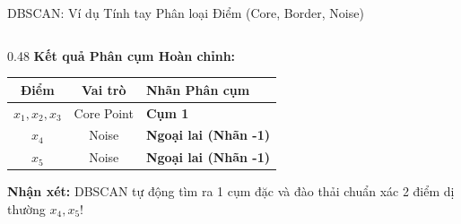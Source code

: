 \documentclass[aspectratio=169,10pt]{beamer}
\begin{document}
\begin{frame}{DBSCAN: Ví dụ Tính tay Phân loại Điểm (Core, Border, Noise)}
\begin{columns}[T]
\begin{column}{0.48\textwidth}
      \textbf{Kết quả Phân cụm Hoàn chỉnh:}
      \begin{table}[]
        \centering
        \begin{tabular}{c c l}
          \toprule
          \textbf{Điểm} & \textbf{Vai trò} & \textbf{Nhãn Phân cụm} \\
          \midrule
          $x_1, x_2, x_3$ & Core Point & \textbf{Cụm 1} \\
          $x_4$ & Noise & \textbf{Ngoại lai (Nhãn -1)} \\
          $x_5$ & Noise & \textbf{Ngoại lai (Nhãn -1)} \\
          \bottomrule
        \end{tabular}
      \end{table}
      \textbf{Nhận xét:} DBSCAN tự động tìm ra 1 cụm đặc và đào thải chuẩn xác 2 điểm dị thường $x_4, x_5$!
    \end{column}
  \end{columns}
\end{frame}
\end{document}
